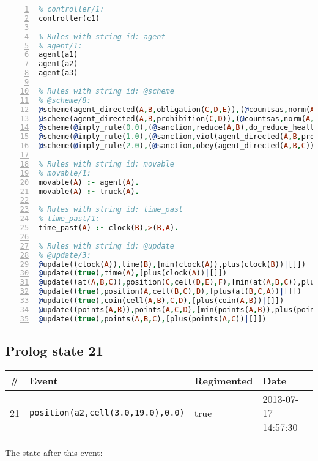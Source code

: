 \documentclass[11pt]{article}\usepackage[utf8]{inputenc}\usepackage{geometry}
\begin{document}
\begin{lstlisting}[language=Prolog, numbers=left]
% Rules with string id: controller
% controller/1:
controller(c1)

% Rules with string id: agent
% agent/1:
agent(a1)
agent(a2)
agent(a3)

% Rules with string id: @scheme
% @scheme/8:
@scheme(agent_directed(A,B,obligation(C,D,E)),(@countsas,norm(A,B,F,obligation(C,D,E)),F),false,(listTrue(C)),(time_past(D)),false,[plus(viol(agent_directed(A,B,obligation(C,D,E))))|[]],[plus(obey(agent_directed(A,B,obligation(C,D,E))))|[]])
@scheme(agent_directed(A,B,prohibition(C,D)),(@countsas,norm(A,B,E,prohibition(C,D)),E),(listTrue(C)),false,(false),false,[plus(viol(agent_directed(A,B,prohibition(C,D))))|[]],[plus(obey(agent_directed(A,B,prohibition(C,D))))|[]])
@scheme(@imply_rule(0.0),(@sanction,reduce(A,B),do_reduce_health(A,B),notifyAgent(A,changed(status))),true,false,false,false,[min(reduce(A,B))|[]],[])
@scheme(@imply_rule(1.0),(@sanction,viol(agent_directed(A,B,prohibition(C,D))),do_sanction(D)),true,false,false,false,[min(viol(agent_directed(A,B,prohibition(C,D))))|[]],[])
@scheme(@imply_rule(2.0),(@sanction,obey(agent_directed(A,B,C))),true,false,false,false,[min(obey(agent_directed(A,B,C)))|[]],[])

% Rules with string id: movable
% movable/1:
movable(A) :- agent(A).
movable(A) :- truck(A).

% Rules with string id: time_past
% time_past/1:
time_past(A) :- clock(B),>(B,A).

% Rules with string id: @update
% @update/3:
@update((clock(A)),time(B),[min(clock(A)),plus(clock(B))|[]])
@update((true),time(A),[plus(clock(A))|[]])
@update((at(A,B,C)),position(C,cell(D,E),F),[min(at(A,B,C)),plus(at(D,E,C))|[]])
@update((true),position(A,cell(B,C),D),[plus(at(B,C,A))|[]])
@update((true),coin(cell(A,B),C,D),[plus(coin(A,B))|[]])
@update((points(A,B)),points(A,C,D),[min(points(A,B)),plus(points(A,D))|[]])
@update((true),points(A,B,C),[plus(points(A,C))|[]])

\end{lstlisting}
\clearpage 
\subsection{Prolog state 21}
\begin{table}[ht]
\centering 
\begin{tabular}{l l l l} 
\textbf{\#} & \textbf{Event} & \textbf{Regimented} & \textbf{Date} \\ [0.5ex] 
\hline
21&\texttt{position(a2,cell(3.0,19.0),0.0)}&true&2013-07-17 14:57:30\\ [1ex] \hline\end{tabular}
\end{table}
The state after this event:
\end{document}
